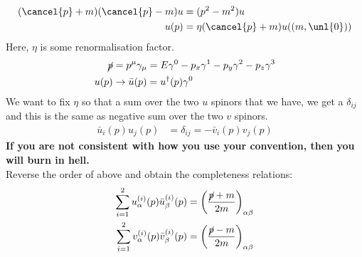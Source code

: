 \documentclass[a4paper, 11pt, normalem]{report}
\begin{document}
\begin{align}
    (\cancel{p}+m)(\cancel{p}-m)u &= (p^2-m^2)u \\
    u(p) &= \eta(\cancel{p}+m)u((m,\unl{0}))
\end{align}
Here, $\eta$ is some renormalisation factor.
\begin{align}
    \cancel{p} &= p^\mu\gamma_\mu = E\gamma^0 - p_x\gamma^1 - p_y\gamma^2 - p_z\gamma^3 \\
    u(p) &\to \bar{u}(p) = u^\dagger(p)\gamma^0
\end{align}
We want to fix $\eta$ so that a sum over the two $u$ spinors that we have, we get a $\delta_{ij}$ and this is the same as negative sum over the two $v$ spinors.
\begin{align}
    \bar{u}_i(p)u_j(p) &= \delta_{ij} = -\bar{v}_i(p)v_j(p)
\end{align}
\textbf{If you are not consistent with how you use your convention, then you will burn in hell.}\\
Reverse the order of above and obtain the completeness relations:
\begin{align}
    \sum_{i=1}^2 u^{(i)}_\alpha(p)\bar{u}^{(i)}_\beta(p) &= \left(\frac{\cancel{p}+m}{2m}\right)_{\alpha\beta} \\
    \sum_{i=1}^2 v_\alpha^{(i)}(p)\bar{v}_\beta^{(i)}(p) &= \left(\frac{\cancel{p}-m}{2m}\right)_{\alpha\beta}
\end{align}
\end{document}

